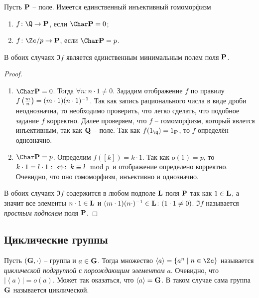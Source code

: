 \begin{theorem}
  Пусть $\mathbf{P}$ -- поле. Имеется единственный инъективный гомоморфизм
    \begin{enumerate}
      \item $f\colon\Q\to\Pb$, если $\Char\Pb=0$;
      \item $f\colon \Zc/p\to\Pb$, если $\Char\Pb=p$.
    \end{enumerate}  
  В обоих случаях $\Im f$ является единственным минимальным полем поля $\mathbf{P}$.
\end{theorem}
\begin{proof}\par\strut\\
  \begin{enumerate}
    \item $\Char\Pb=0$. Тогда $\forall n\colon n\cdot1\ne0$. Зададим
      отображение $f$ по правилу
      $f\left(\frac{m}n\right)\bw=(m\cdot1)(n\cdot 1)^{-1}$. Так как
      запись рационального числа в виде дроби неоднозначна, то
      необходимо проверить, что легко сделать, что подобное задание
      $f$ корректно. Далее проверяем, что $f$ -- гомоморфизм, который
      явлется инъективным, так как $\mathbf{Q}$ -- поле. Так как
      $f(1_\Q)=1_{\Pb}$, то $f$ определён однозначно.
    \item $\Char\Pb=p$. Определим $f([k])=k\cdot1$. Так как $o(1)=p$, то $k\cdot1=l\cdot1\mathbin{\colon\Leftrightarrow\colon} k\equiv l\mod p$ и отображение определено корректно. Очевидно, что оно гомоморфизм, инъективно и однозначно.
  \end{enumerate}
  
  В обоих случаях $\Im f$ содержится в любом подполе $\mathbf{L}$ поля $\mathbf{P}$ так как $1\in\mathbf{L}$, а значит все элементы $n\cdot1\in\mathbf{L}$ и $(m\cdot1)(n\cdot)^{-1}\in\mathbf{L}\colon(1\cdot1\ne0)$. $\Im f$ называется \emph{простым подполем} поля $\mathbf{P}$.
\end{proof}
\subsection{Циклические группы}

\begin{df}
Пусть $(\mathbf{G},\cdot)$ -- группа и $a\in\mathbf{G}$. Тогда множество $\left\langle a\right\rangle=\{a^n\mid n\in\Zc\}$ называется \emph{циклической подгруппой} с \emph{порождающим элементом} $a$. Очевидно, что $|\left\langle a\right\rangle|=o(a)$. Может так оказаться, что $\left\langle a\right\rangle = \mathbf{G}$. В таком случае сама группа $\mathbf{G}$ называется циклической.
\end{df}


